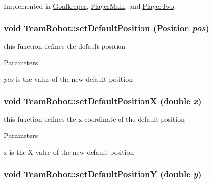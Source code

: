 Implemented in \hyperlink{classGoalkeeper_acfa6fbad0f6b1627fd59cc7cce6ff321}{Goalkeeper}, \hyperlink{classPlayerMain_a5c4af159392663660f91809052422945}{PlayerMain}, and \hyperlink{classPlayerTwo_aa0294cf24297f66ffd92f1a250794340}{PlayerTwo}.

\hypertarget{classTeamRobot_a322f046e260aedff6f2c8edc5730c9ac}{
\subsubsection[{setDefaultPosition}]{\setlength{\rightskip}{0pt plus 5cm}void TeamRobot::setDefaultPosition (Position {\em pos})}}
\label{classTeamRobot_a322f046e260aedff6f2c8edc5730c9ac}


this function defines the default position 


\begin{DoxyParams}{Parameters}
\item[{\em pos}]is the value of the new default position \end{DoxyParams}
\hypertarget{classTeamRobot_a527cefdb32f2bc0a4fa770207d4dc934}{
\subsubsection[{setDefaultPositionX}]{\setlength{\rightskip}{0pt plus 5cm}void TeamRobot::setDefaultPositionX (double {\em x})}}
\label{classTeamRobot_a527cefdb32f2bc0a4fa770207d4dc934}


this function defines the x coordinate of the default position 


\begin{DoxyParams}{Parameters}
\item[{\em x}]is the X value of the new default position \end{DoxyParams}
\hypertarget{classTeamRobot_afeb86cb88b18030049d525d1d6790e6e}{
\subsubsection[{setDefaultPositionY}]{\setlength{\rightskip}{0pt plus 5cm}void TeamRobot::setDefaultPositionY (double {\em y})}}
\label{classTeamRobot_afeb86cb88b18030049d525d1d6790e6e}


